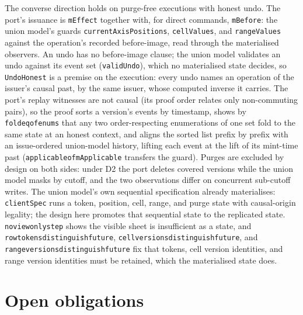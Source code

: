 \documentclass[11pt]{article}
\newcommand{\lean}[1]{\texttt{\def\_{\textunderscore\allowbreak}#1}}
\begin{document}
The converse direction holds on purge-free executions with honest undo.
The port's issuance is \lean{mEffect} together with, for direct commands,
\lean{mBefore}: the union model's guards \lean{currentAxisPositions},
\lean{cellValues}, and \lean{rangeValues} against the operation's recorded
before-image, read through the materialised observers. An undo has no
before-image clause; the union model validates an undo against its event set
(\lean{validUndo}), which no materialised state decides, so \lean{UndoHonest}
is a premise on the execution: every undo names an operation of the issuer's
causal past, by the same issuer, whose computed inverse it carries. The
port's replay witnesses are not causal (its proof order relates only
non-commuting pairs), so the proof sorts a version's events by timestamp,
shows by \lean{fold\_eq\_of\_enums} that any two order-respecting
enumerations of one set fold to the same state at an honest context, and
aligns the sorted list prefix by prefix with an issue-ordered union-model
history, lifting each event at the lift of its mint-time past
(\lean{applicable\_of\_mApplicable} transfers the guard). Purges are
excluded by design on both sides: under D2 the port deletes covered
versions while the union model masks by cutoff, and the two observations
differ on concurrent sub-cutoff writes. The union model's own sequential
specification already materialises: \lean{clientSpec} runs a token,
position, cell, range, and purge state with causal-origin legality; the
design here promotes that sequential state to the replicated state.
\lean{no\_view\_only\_step} shows the visible sheet is insufficient as a
state, and \lean{row\_tokens\_distinguish\_future},
\lean{cell\_versions\_distinguish\_future}, and
\lean{range\_versions\_distinguish\_future} fix that tokens, cell version
identities, and range version identities must be retained, which the
materialised state does.

\section{Open obligations}
\end{document}
